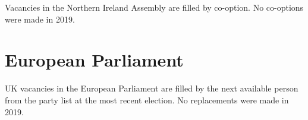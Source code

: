 Vacancies in the Northern Ireland Assembly are filled by co-option.
No co-options were made in 2019.
%

\section{European Parliament}

UK vacancies in the European Parliament are filled by the next available person from the party list at the most recent election. 
No replacements were made in 2019.

